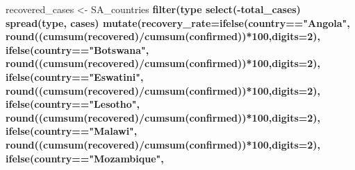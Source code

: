 \documentclass[
]{article}
\newenvironment{Shaded}{\begin{snugshade}}{\end{snugshade}}
\newcommand{\DataTypeTok}[1]{\textcolor[rgb]{0.13,0.29,0.53}{#1}}
\newcommand{\DecValTok}[1]{\textcolor[rgb]{0.00,0.00,0.81}{#1}}
\newcommand{\KeywordTok}[1]{\textcolor[rgb]{0.13,0.29,0.53}{\textbf{#1}}}
\newcommand{\NormalTok}[1]{#1}
\newcommand{\OperatorTok}[1]{\textcolor[rgb]{0.81,0.36,0.00}{\textbf{#1}}}
\newcommand{\StringTok}[1]{\textcolor[rgb]{0.31,0.60,0.02}{#1}}
\begin{document}
\begin{Shaded}
\begin{Highlighting}[]
\NormalTok{recovered_cases <-}\StringTok{ }\NormalTok{SA_countries }\OperatorTok{%>%}\StringTok{ }
\StringTok{  }\KeywordTok{filter}\NormalTok{(type }\OperatorTok{%in%}\StringTok{ }\KeywordTok{c}\NormalTok{(}\StringTok{"recovered"}\NormalTok{,}\StringTok{"confirmed"}\NormalTok{)) }\OperatorTok{%>%}\StringTok{ }
\StringTok{   }\KeywordTok{select}\NormalTok{(}\OperatorTok{-}\NormalTok{total_cases) }\OperatorTok{%>%}\StringTok{ }
\StringTok{  }\KeywordTok{spread}\NormalTok{(type, cases) }\OperatorTok{%>%}
\StringTok{  }\KeywordTok{mutate}\NormalTok{(}\DataTypeTok{recovery_rate=}\KeywordTok{ifelse}\NormalTok{(country}\OperatorTok{==}\StringTok{"Angola"}\NormalTok{,}
                         \KeywordTok{round}\NormalTok{((}\KeywordTok{cumsum}\NormalTok{(recovered)}\OperatorTok{/}\KeywordTok{cumsum}\NormalTok{(confirmed))}\OperatorTok{*}\DecValTok{100}\NormalTok{,}\DataTypeTok{digits=}\DecValTok{2}\NormalTok{),}
                       \KeywordTok{ifelse}\NormalTok{(country}\OperatorTok{==}\StringTok{"Botswana"}\NormalTok{,}
                         \KeywordTok{round}\NormalTok{((}\KeywordTok{cumsum}\NormalTok{(recovered)}\OperatorTok{/}\KeywordTok{cumsum}\NormalTok{(confirmed))}\OperatorTok{*}\DecValTok{100}\NormalTok{,}\DataTypeTok{digits=}\DecValTok{2}\NormalTok{),}
                       \KeywordTok{ifelse}\NormalTok{(country}\OperatorTok{==}\StringTok{"Eswatini"}\NormalTok{,}
                         \KeywordTok{round}\NormalTok{((}\KeywordTok{cumsum}\NormalTok{(recovered)}\OperatorTok{/}\KeywordTok{cumsum}\NormalTok{(confirmed))}\OperatorTok{*}\DecValTok{100}\NormalTok{,}\DataTypeTok{digits=}\DecValTok{2}\NormalTok{),}
                       \KeywordTok{ifelse}\NormalTok{(country}\OperatorTok{==}\StringTok{"Lesotho"}\NormalTok{,}
                         \KeywordTok{round}\NormalTok{((}\KeywordTok{cumsum}\NormalTok{(recovered)}\OperatorTok{/}\KeywordTok{cumsum}\NormalTok{(confirmed))}\OperatorTok{*}\DecValTok{100}\NormalTok{,}\DataTypeTok{digits=}\DecValTok{2}\NormalTok{),}
                       \KeywordTok{ifelse}\NormalTok{(country}\OperatorTok{==}\StringTok{"Malawi"}\NormalTok{,}
                         \KeywordTok{round}\NormalTok{((}\KeywordTok{cumsum}\NormalTok{(recovered)}\OperatorTok{/}\KeywordTok{cumsum}\NormalTok{(confirmed))}\OperatorTok{*}\DecValTok{100}\NormalTok{,}\DataTypeTok{digits=}\DecValTok{2}\NormalTok{),}
                       \KeywordTok{ifelse}\NormalTok{(country}\OperatorTok{==}\StringTok{"Mozambique"}\NormalTok{,}
}}}}
\end{Highlighting}
\end{Shaded}
\end{document}

